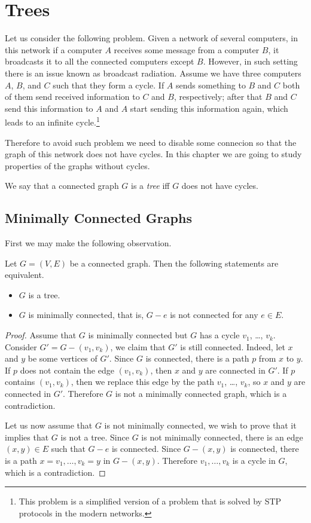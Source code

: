 \chapter{Trees}
Let us consider the following problem. Given a network of several computers,
in this network if a computer $A$ receives some message from a computer $B$,
it broadcasts it to all the connected computers except $B$.
However, in such setting there is an issue known as broadcast radiation.
Assume we have three computers $A$, $B$, and $C$ such that they form a cycle.
If $A$ sends something to $B$ and $C$ both of them send received information to
$C$ and $B$, respectively; after that $B$ and $C$ send this information to $A$
and $A$ start sending this information again, which leads to an infinite
cycle.\footnote{%
  This problem is a simplified version of a problem that is solved by STP
  protocols in the modern networks.
}

Therefore to avoid such problem we need to disable some connecion so that the
graph of this network does not have cycles.
In this chapter we are going to study properties of the graphs without cycles.
\begin{definition}
  We say that a connected graph $G$ is a \emph{tree} iff $G$ does not have cycles.
\end{definition}

\section{Minimally Connected Graphs}
First we may make the following observation.
\begin{theorem}
  Let $G = (V, E)$ be a connected graph. Then the following statements are
  equivalent.
  \begin{itemize}
    \item $G$ is a tree.
    \item $G$ is minimally connected, that is, $G - e$ is not connected for any
      $e \in E$.
  \end{itemize}
\end{theorem}
\begin{proof}
  Assume that $G$ is minimally connected but $G$ has a cycle
  $v_1$, \dots, $v_k$. Consider $G' = G - (v_1, v_k)$, we claim that $G'$
  is still connected. Indeed, let $x$ and $y$ be some vertices of $G'$.
  Since $G$ is connected, there is a path $p$ from $x$ to $y$. If $p$ does not
  contain the edge $(v_1, v_k)$, then $x$ and $y$ are connected in $G'$. If
  $p$ contains $(v_1, v_k)$, then we replace this edge by the path $v_1$, \dots,
  $v_k$, so $x$ and $y$ are connected in $G'$. Therefore $G$ is not a minimally
  connected graph, which is a contradiction.

  Let us now assume that $G$ is not minimally connected, we wish to prove that
  it implies that $G$ is not a tree. Since $G$ is not minimally connected, there
  is an edge $(x, y) \in E$ such that $G - e$ is connected. Since $G - (x, y)$
  is connected, there is a path $x = v_1, \dots, v_k = y$ in $G - (x, y)$.
  Therefore $v_1, \dots, v_k$ is a cycle in $G$, which is a contradiction.
 \end{proof}


